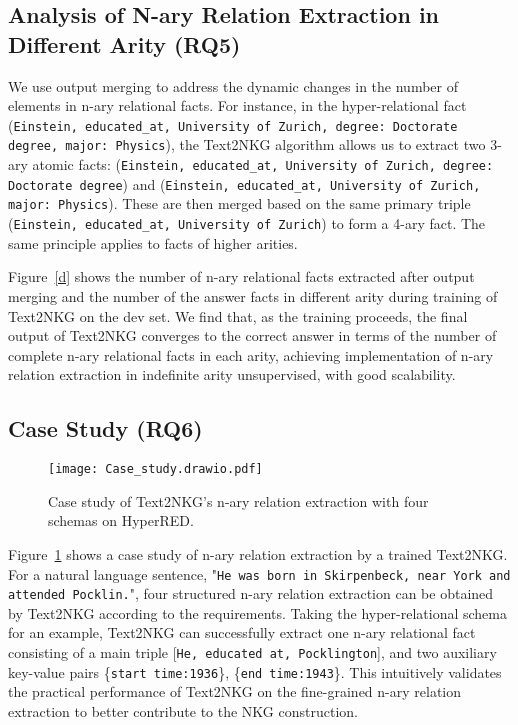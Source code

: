 \documentclass{article} \usepackage{iclr2024_conference,times}
\begin{document}
\subsection{Analysis of N-ary Relation Extraction in Different Arity (RQ5)}

We use output merging to address the dynamic changes in the number of elements in n-ary relational facts. For instance, in the hyper-relational fact (\texttt{Einstein, educated\_at, University of Zurich, degree: Doctorate degree, major: Physics}), the Text2NKG algorithm allows us to extract two 3-ary atomic facts: (\texttt{Einstein, educated\_at, University of Zurich, degree: Doctorate degree}) and (\texttt{Einstein, educated\_at, University of Zurich, major: Physics}). These are then merged based on the same primary triple (\texttt{Einstein, educated\_at, University of Zurich}) to form a 4-ary fact. The same principle applies to facts of higher arities.

Figure~\ref{d} shows the number of n-ary relational facts extracted after output merging and the number of the answer facts in different arity during training of Text2NKG on the dev set. We find that, as the training proceeds, the final output of Text2NKG converges to the correct answer in terms of the number of complete n-ary relational facts in each arity, achieving implementation of n-ary relation extraction in indefinite arity unsupervised, with good scalability.


\subsection{Case Study (RQ6)}
\begin{figure}[t]
\centering
\texttt{[image: Case\_study.drawio.pdf]}
\caption{Case study of Text2NKG's n-ary relation extraction with four schemas on HyperRED.}
\label{case}
\end{figure}



Figure~\ref{case} shows a case study of n-ary relation extraction by a trained Text2NKG. For a natural language sentence, "\texttt{He was born in Skirpenbeck, near York and attended Pocklin.}", four structured n-ary relation extraction can be obtained by Text2NKG according to the requirements. Taking the hyper-relational schema for an example, Text2NKG can successfully extract one n-ary relational fact consisting of a main triple [\texttt{He, educated at, Pocklington}], and two auxiliary key-value pairs \{\texttt{start time:1936}\}, \{\texttt{end time:1943}\}. This intuitively validates the practical performance of Text2NKG on the fine-grained n-ary relation extraction to better contribute to the NKG construction. 
\end{document}
